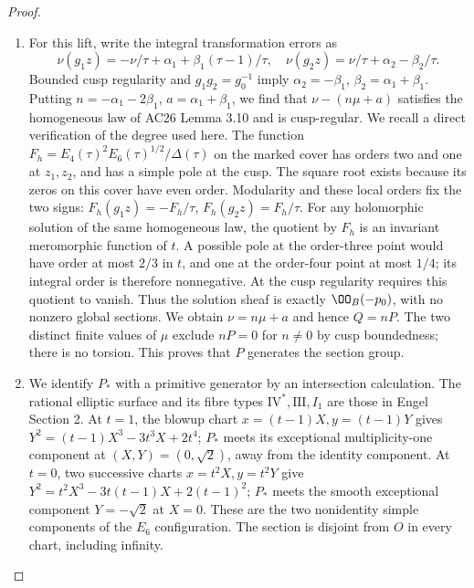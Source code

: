 \begin{proof}
\begin{enumerate}[label=\arabic*.,leftmargin=*]
\item For this lift, write the integral transformation errors as
\[
\nu(g_1z)=-\nu/\tau+\alpha_1+\beta_1(\tau-1)/\tau,
\quad
\nu(g_2z)=\nu/\tau+\alpha_2-\beta_2/\tau.
\]
Bounded cusp regularity and $g_1g_2=g_0^{-1}$ imply
$\alpha_2=-\beta_1$, $\beta_2=\alpha_1+\beta_1$.
Putting $n=-\alpha_1-2\beta_1$, $a=\alpha_1+\beta_1$, we find that
$\nu-(n\mu+a)$ satisfies the homogeneous law of AC26 Lemma 3.10
and is cusp-regular.  We recall a direct verification of the degree
used here.  The function
$F_h=E_4(\tau)^2E_6(\tau)^{1/2}/\Delta(\tau)$ on the marked cover
has orders two and one at $z_1,z_2$, and has a simple pole at the
cusp.  The square root exists because its zeros on this cover have
even order.  Modularity and these local orders fix the two signs:
$F_h(g_1z)=-F_h/\tau$, $F_h(g_2z)=F_h/\tau$.
For any holomorphic solution of the same homogeneous law, the
quotient by $F_h$ is an invariant meromorphic function of $t$.
A possible pole at the order-three point would have order at most
$2/3$ in $t$, and one at the order-four point at most $1/4$; its
integral order is therefore nonnegative.  At the cusp regularity
requires this quotient to vanish.  Thus the solution sheaf is
exactly $\OO_B(-p_0)$, with no nonzero global sections.
We obtain $\nu=n\mu+a$ and hence $Q=nP$.  The two distinct
finite values of $\mu$ exclude $nP=0$ for $n\ne0$ by cusp boundedness;
there is no torsion.  This proves that $P$ generates the section group.

\item We identify $P_*$ with a primitive generator by an intersection
calculation.  The rational elliptic surface and its fibre types
$\mathrm{IV}^*,\mathrm{III},I_1$ are those in Engel Section 2.
At $t=1$, the blowup chart $x=(t-1)X,y=(t-1)Y$ gives
$Y^2=(t-1)X^3-3t^3X+2t^4$; $P_*$ meets its exceptional
multiplicity-one component at $(X,Y)=(0,\sqrt2)$, away from the
identity component.  At $t=0$, two successive charts
$x=t^2X,y=t^2Y$ give
$Y^2=t^2X^3-3t(t-1)X+2(t-1)^2$; $P_*$ meets the smooth exceptional
component $Y=-\sqrt2$ at $X=0$.  These are the two nonidentity
simple components of the $E_6$ configuration.  The section is
disjoint from $O$ in every chart, including infinity.


\end{enumerate}
\end{proof}
